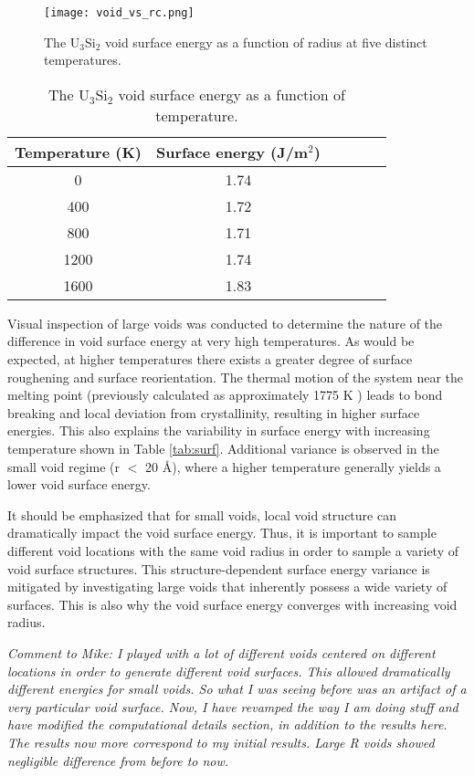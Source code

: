 \documentclass[review]{elsarticle}
\begin{document}
\begin{figure}[h]
 \centering
 \texttt{[image: void\_vs\_rc.png]} 
 \caption{The U$_{3}$Si$_{2}$ void surface energy as a function of radius at five distinct temperatures. }
 \label{fig:void}
\end{figure}

\begin{table}[h]
\caption{The U$_{3}$Si$_{2}$ void surface energy as a function of temperature.} \label{tab:void}
\begin{center}
\begin{tabular}{|c|c|c|c|c|c|}
	\hline
	Temperature (K) & Surface energy (J/m$^{2}$)\\
	 \hline
	 0 & 1.74	 \\
	 400 & 1.72 \\
	 800 & 1.71	 \\
	 1200 & 1.74 \\
	 1600 & 1.83 \\
	 \hline
\end{tabular}
\end{center}
\label{default}
\end{table}

Visual inspection of large voids was conducted to determine the nature of the difference in void surface energy at very high temperatures. As would be expected, at higher temperatures there exists a greater degree of surface roughening and surface reorientation. The thermal motion of the system near the melting point (previously calculated as approximately 1775 K \cite{beelerUSi}) leads to bond breaking and local deviation from crystallinity, resulting in higher surface energies. This also explains the variability in surface energy with increasing temperature shown in Table \ref{tab:surf}. Additional variance is observed in the small void regime (r $<$ 20 {\AA}), where a higher temperature generally yields a lower void surface energy. 

It should be emphasized that for small voids, local void structure can dramatically impact the void surface energy. Thus, it is important to sample different void locations with the same void radius in order to sample a variety of void surface structures. This structure-dependent surface energy variance is mitigated by investigating large voids that inherently possess a wide variety of surfaces. This is also why the void surface energy converges with increasing void radius. 

\textit{\color{blue}Comment to Mike: I played with a lot of different voids centered on different locations in order to generate different void surfaces. This allowed dramatically different energies for small voids. So what I was seeing before was an artifact of a very particular void surface. Now, I have revamped the way I am doing stuff and have modified the computational details section, in addition to the results here. The results now more correspond to my initial results. Large R voids showed negligible difference from before to now. } 
\end{document}
